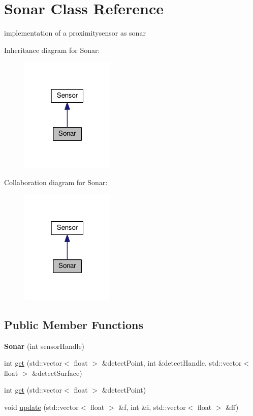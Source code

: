 \hypertarget{classSonar}{}\section{Sonar Class Reference}
\label{classSonar}


implementation of a proximitysensor as sonar  




Inheritance diagram for Sonar\+:\nopagebreak
\begin{figure}[H]
\begin{center}
\leavevmode
\includegraphics[width=127pt]{classSonar__inherit__graph}
\end{center}
\end{figure}


Collaboration diagram for Sonar\+:\nopagebreak
\begin{figure}[H]
\begin{center}
\leavevmode
\includegraphics[width=127pt]{classSonar__coll__graph}
\end{center}
\end{figure}
\subsection*{Public Member Functions}
\begin{DoxyCompactItemize}
\item 
{\bfseries Sonar} (int sensor\+Handle)\hypertarget{classSonar_ae6edd4f329f9892a64c5f0cab808c7a2}{}\label{classSonar_ae6edd4f329f9892a64c5f0cab808c7a2}

\item 
int \hyperlink{classSonar_a6881d0c104c0fafad95ad1aea917b6f3}{get} (std\+::vector$<$ float $>$ \&detect\+Point, int \&detect\+Handle, std\+::vector$<$ float $>$ \&detect\+Surface)
\item 
int \hyperlink{classSonar_af77f9c5b9db42276b06b3b044c738284}{get} (std\+::vector$<$ float $>$ \&detect\+Point)
\item 
void \hyperlink{classSonar_ab32f714b0c5412e64ec60997467074bc}{update} (std\+::vector$<$ float $>$ \&f, int \&i, std\+::vector$<$ float $>$ \&ff)
\end{DoxyCompactItemize}
